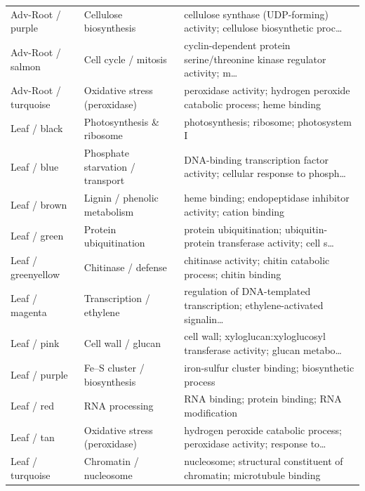\documentclass[pdflatex,sn-nature]{sn-jnl}
\begin{document}
\begin{longtable}{@{}l l p{5.6cm}@{}}
Adv-Root / purple & Cellulose biosynthesis & cellulose synthase (UDP-forming) activity; cellulose biosynthetic proc\ldots \\
Adv-Root / salmon & Cell cycle / mitosis & cyclin-dependent protein serine/threonine kinase regulator activity; m\ldots \\
Adv-Root / turquoise & Oxidative stress (peroxidase) & peroxidase activity; hydrogen peroxide catabolic process; heme binding \\
Leaf / black & Photosynthesis \& ribosome & photosynthesis; ribosome; photosystem I \\
Leaf / blue & Phosphate starvation / transport & DNA-binding transcription factor activity; cellular response to phosph\ldots \\
Leaf / brown & Lignin / phenolic metabolism & heme binding; endopeptidase inhibitor activity; cation binding \\
Leaf / green & Protein ubiquitination & protein ubiquitination; ubiquitin-protein transferase activity; cell s\ldots \\
Leaf / greenyellow & Chitinase / defense & chitinase activity; chitin catabolic process; chitin binding \\
Leaf / magenta & Transcription / ethylene & regulation of DNA-templated transcription; ethylene-activated signalin\ldots \\
Leaf / pink & Cell wall / glucan & cell wall; xyloglucan:xyloglucosyl transferase activity; glucan metabo\ldots \\
Leaf / purple & Fe--S cluster / biosynthesis & iron-sulfur cluster binding; biosynthetic process \\
Leaf / red & RNA processing & RNA binding; protein binding; RNA modification \\
Leaf / tan & Oxidative stress (peroxidase) & hydrogen peroxide catabolic process; peroxidase activity; response to\ldots \\
Leaf / turquoise & Chromatin / nucleosome & nucleosome; structural constituent of chromatin; microtubule binding \\
\end{longtable}
\end{document}
